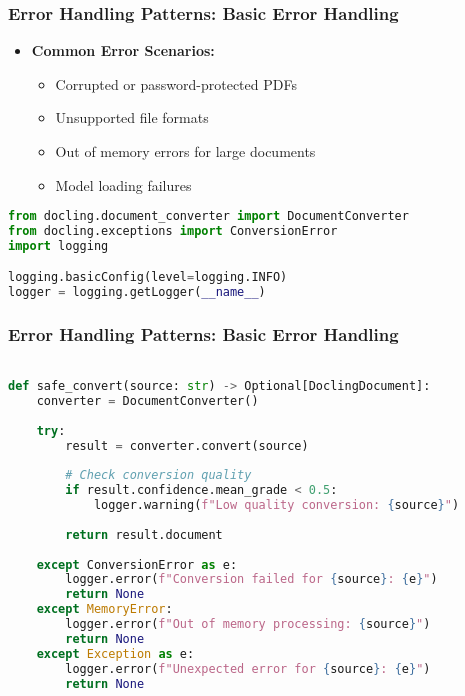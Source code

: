 \begin{frame}[fragile]\frametitle{Error Handling Patterns: Basic Error Handling}
      \begin{itemize}
        \item \textbf{Common Error Scenarios:}
        \begin{itemize}
            \item Corrupted or password-protected PDFs
            \item Unsupported file formats
            \item Out of memory errors for large documents
            \item Model loading failures
        \end{itemize}
      \end{itemize}

\begin{lstlisting}[language=Python, basicstyle=\tiny]
from docling.document_converter import DocumentConverter
from docling.exceptions import ConversionError
import logging

logging.basicConfig(level=logging.INFO)
logger = logging.getLogger(__name__)

\end{lstlisting}
\end{frame}


\begin{frame}[fragile]\frametitle{Error Handling Patterns: Basic Error Handling}

\begin{lstlisting}[language=Python, basicstyle=\tiny]

def safe_convert(source: str) -> Optional[DoclingDocument]:
    converter = DocumentConverter()
    
    try:
        result = converter.convert(source)
        
        # Check conversion quality
        if result.confidence.mean_grade < 0.5:
            logger.warning(f"Low quality conversion: {source}")
            
        return result.document
        
    except ConversionError as e:
        logger.error(f"Conversion failed for {source}: {e}")
        return None
    except MemoryError:
        logger.error(f"Out of memory processing: {source}")
        return None
    except Exception as e:
        logger.error(f"Unexpected error for {source}: {e}")
        return None
\end{lstlisting}
\end{frame}

